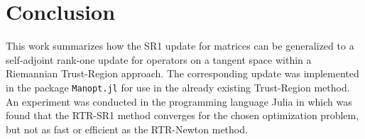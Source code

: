 \chapter{Conclusion}

This work summarizes how the SR1 update for matrices can be generalized to a self-adjoint rank-one update for operators on a tangent space within a Riemannian Trust-Region approach. The corresponding update was implemented in the package \lstinline!Manopt.jl! for use in the already existing Trust-Region method. An experiment was conducted in the programming language Julia in which was found that the RTR-SR1 method converges for the chosen optimization problem, but not as fast or efficient as the RTR-Newton method.
